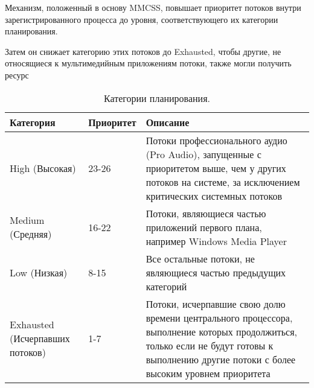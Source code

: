             Механизм, положенный в основу MMCSS, повышает приоритет потоков внутри зарегистрированного процесса до уровня, соответствующего их категории планирования.
            
            Затем он снижает категорию этих потоков до Exhausted, чтобы другие, не относящиеся к мультимедийным приложениям потоки, также могли получить ресурс
            
            \begin{table}[h]
                \caption{Категории планирования.}
                \begin{center}
                    \begin{tabular}{|p{40mm}|p{30mm}|p{80mm}|}
                        \hline
                        Категория & Приоритет & Описание\\
                        \hline
                        High (Высокая) & 23-26 & Потоки профессионального аудио (Pro Audio), запущенные с приоритетом выше, чем у других потоков на системе, за исключением критических системных потоков \\
                        \hline
                        Medium (Средняя) & 16-22 & Потоки, являющиеся частью приложений первого плана, например Windows Media Player \\
                        \hline
                        Low (Низкая) & 8-15 & Все остальные потоки, не являющиеся частью предыдущих категорий \\
                        \hline
                        Exhausted (Исчерпавших потоков) & 1-7 & Потоки, исчерпавшие свою долю времени центрального процессора, выполнение которых продолжиться, только если не будут готовы к выполнению другие потоки с более высоким уровнем приоритета \\
                        \hline
                    \end{tabular}
                \end{center}
                \label{tab:plan}
            \end{table}
